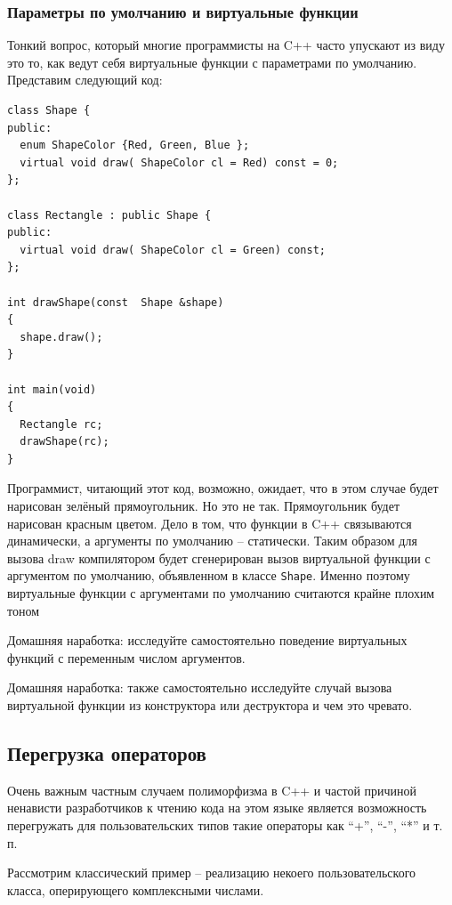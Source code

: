 \documentclass[a4paper,12pt,oneside]{article}
\begin{document}
\subsubsection{Параметры по умолчанию и виртуальные функции}

Тонкий вопрос, который многие программисты на C++ часто упускают из виду это то, как ведут себя виртуальные функции с параметрами по умолчанию. Представим следующий код:

\begin{lstlisting}
class Shape {
public:
  enum ShapeColor {Red, Green, Blue };
  virtual void draw( ShapeColor cl = Red) const = 0;
};

class Rectangle : public Shape {
public:
  virtual void draw( ShapeColor cl = Green) const;
};

int drawShape(const  Shape &shape)
{
  shape.draw();
}

int main(void)
{
  Rectangle rc;
  drawShape(rc);
}
\end{lstlisting}

Программист, читающий этот код, возможно, ожидает, что в этом случае будет нарисован зелёный прямоугольник. Но это не так. Прямоугольник будет нарисован красным цветом. Дело в том, что функции в C++ связываются динамически, а аргументы по умолчанию – статически. Таким образом для вызова draw компилятором будет сгенерирован вызов виртуальной функции с аргументом по умолчанию, объявленном в классе \lstinline!Shape!. Именно поэтому виртуальные функции с аргументами по умолчанию считаются крайне плохим тоном

Домашняя наработка: исследуйте самостоятельно поведение виртуальных функций с переменным числом аргументов.

Домашняя наработка: также самостоятельно исследуйте случай вызова виртуальной функции из конструктора или деструктора и чем это чревато.

\subsection{Перегрузка операторов}\label{OperatorOverloading}

Очень важным частным случаем полиморфизма в C++ и частой причиной ненависти разработчиков к чтению кода на этом языке является возможность перегружать для пользовательских типов такие операторы как ``+'', ``-'', ``*'' и т. п.

Рассмотрим классический пример – реализацию некоего пользовательского класса, оперирующего комплексными числами.
\end{document}
